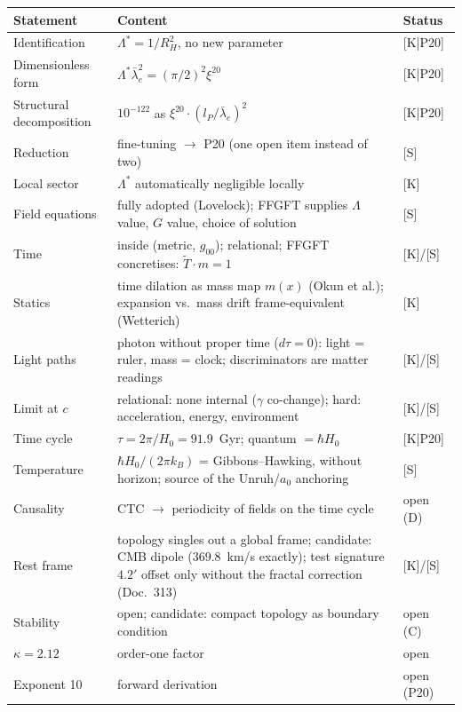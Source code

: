 \documentclass[11pt]{report}
\begin{document}
\begin{center}
\begin{tabular}{lp{6.5cm}l}
\toprule
Statement & Content & Status \\
\midrule
Identification & $\Lambda^{*} = 1/R_H^2$, no new parameter
  & [K|P20] \\
Dimensionless form & $\Lambda^{*}\bar\lambda_e^2 = (\pi/2)^2\xi^{20}$
  & [K|P20] \\
Structural decomposition & $10^{-122}$ as $\xi^{20}\cdot(l_P/\bar\lambda_e)^2$
  & [K|P20] \\
Reduction & fine-tuning $\to$ P20 (one open item instead of two)
  & [S] \\
Local sector & $\Lambda^{*}$ automatically negligible locally
  & [K] \\
Field equations & fully adopted (Lovelock); FFGFT supplies
  $\Lambda$ value, $G$ value, choice of solution & [S] \\
Time & inside (metric, $g_{00}$); relational; FFGFT concretises:
  $\tilde T \cdot m = 1$ & [K]/[S] \\
Statics & time dilation as mass map $m(x)$ (Okun et al.);
  expansion vs.\ mass drift frame-equivalent (Wetterich) & [K] \\
Light paths & photon without proper time ($d\tau=0$): light =
  ruler, mass = clock; discriminators are matter readings & [K]/[S] \\
Limit at $c$ & relational: none internal ($\gamma$ co-change);
  hard: acceleration, energy, environment & [K]/[S] \\
Time cycle & $\tau = 2\pi/H_0 = 91.9$~Gyr; quantum $= \hbar H_0$
  & [K|P20] \\
Temperature & $\hbar H_0/(2\pi k_B)$ = Gibbons--Hawking, without
  horizon; source of the Unruh/$a_0$ anchoring & [S] \\
Causality & CTC $\to$ periodicity of fields on the time cycle
  & open (D) \\
Rest frame & topology singles out a global frame; candidate: CMB
  dipole ($369.8$~km/s exactly); test signature $4.2'$ offset
  only without the fractal correction (Doc.~313) & [K]/[S] \\
Stability & open; candidate: compact topology as boundary condition
  & open (C) \\
$\kappa = 2.12$ & order-one factor & open \\
Exponent 10 & forward derivation & open (P20) \\
\bottomrule
\end{tabular}
\end{center}
\end{document}
